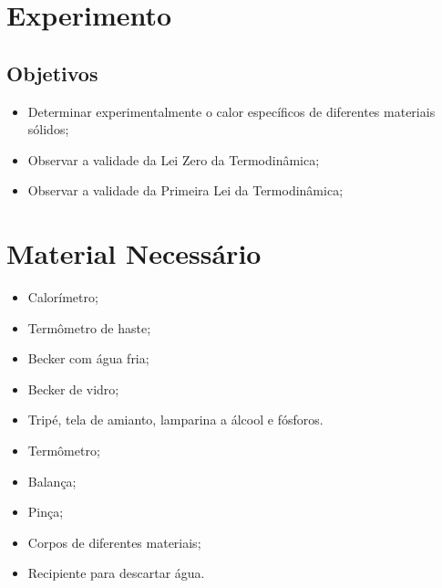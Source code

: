 \section{Experimento}

\subsection{Objetivos}

\begin{itemize}
	\item Determinar experimentalmente o calor específicos de diferentes materiais sólidos;
	\item Observar a validade da Lei Zero da Termodinâmica;
	\item Observar a validade da Primeira Lei da Termodinâmica;
\end{itemize}

\section{Material Necessário}

\begin{itemize}
	\item Calorímetro;
	\item Termômetro de haste;
	\item Becker com água fria;
	\item Becker de vidro;
	\item Tripé, tela de amianto, lamparina a álcool e fósforos.
	\item Termômetro;
	\item Balança;
	\item Pinça;
	\item Corpos de diferentes materiais;
	\item Recipiente para descartar água.
\end{itemize}

